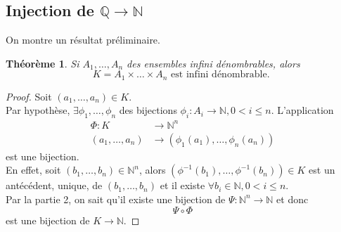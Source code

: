 \documentclass[11pt, a4paper, twoside]{article}
\newtheorem{theorem}{Théorème}
\begin{document}
\subsection*{Injection de $\mathbb{Q} \to \mathbb{N}$}
On montre un résultat préliminaire.\\
\begin{theorem}
Si $ A_1, \ldots, A_n$ des ensembles infini dénombrables, alors
\[ 
K=A_1 \times \ldots \times A_n \text{ est infini dénombrable. } 
\]
\end{theorem}
\begin{proof}
	Soit $(a_1, \ldots, a_n) \in K $.\\
	Par hypothèse, $\exists \phi_1,\ldots, \phi_n$ des bijections $\phi_i: A_i \to \mathbb{N}, 0<i\leq n$.
	L'application
	\begin{align*}
		\Phi: K &\to \mathbb{N}^{n}\\
		( a_1,\ldots, a_n) &\to ( \phi_1(a_1), \ldots, \phi_n(a_n))
	\end{align*}
	est une bijection.\\
	En effet, soit $(b_1,\ldots,b_n) \in \mathbb{N}^{n}$, alors $(\phi^{-1}(b_1), \ldots, \phi^{-1}(b_n)) \in K$ est un antécédent, unique, de $(b_1,\ldots, b_n)$ et il existe $\forall b_i \in \mathbb{N}, 0 < i \leq n$.\\
	Par la partie 2, on sait qu'il existe une bijection de $\Psi: \mathbb{N}^{n} \to \mathbb{N}$ et donc
	\[ 
	\Psi \circ \Phi
	\]
	est une bijection de $K \to \mathbb{N}$.
\end{proof}


\end{document}
